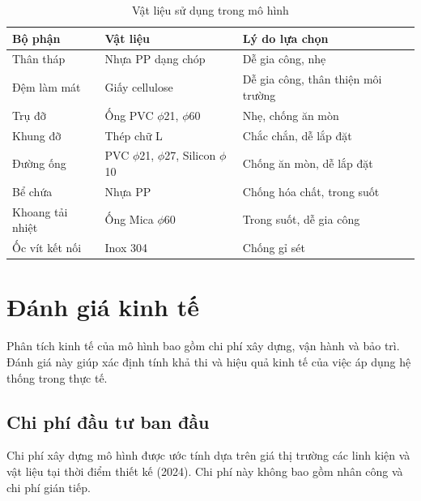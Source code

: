 \documentclass[../main.tex]{subfiles}
\begin{document}
\begin{table}[H]
\centering
\renewcommand{\arraystretch}{1.1}
\caption{Vật liệu sử dụng trong mô hình}
\label{tab:materials}
\begin{tabular}{|l|l|l|}
\hline
\textbf{Bộ phận} & \textbf{Vật liệu} & \textbf{Lý do lựa chọn} \\
\hline
Thân tháp & Nhựa PP dạng chóp & Dễ gia công, nhẹ \\
\hline
Đệm làm mát & Giấy cellulose & Dễ gia công, thân thiện môi trường \\
\hline
Trụ đỡ & Ống PVC $\phi$21, $\phi$60 & Nhẹ, chống ăn mòn \\
\hline
Khung đỡ & Thép chữ L & Chắc chắn, dễ lắp đặt \\
\hline
Đường ống & PVC $\phi$21, $\phi$27, Silicon $\phi$10 & Chống ăn mòn, dễ lắp đặt \\
\hline
Bể chứa & Nhựa PP & Chống hóa chất, trong suốt \\
\hline
Khoang tải nhiệt & Ống Mica $\phi$60 & Trong suốt, dễ gia công \\
\hline
Ốc vít kết nối & Inox 304 & Chống gỉ sét \\
\hline
\end{tabular}
\end{table}

\section{Đánh giá kinh tế}
\label{sec:economic_parameters}

Phân tích kinh tế của mô hình bao gồm chi phí xây dựng, vận hành và bảo trì. Đánh giá này giúp xác định tính khả thi và hiệu quả kinh tế của việc áp dụng hệ thống trong thực tế.

\subsection{Chi phí đầu tư ban đầu}
\label{sec:construction_cost}

Chi phí xây dựng mô hình được ước tính dựa trên giá thị trường các linh kiện và vật liệu tại thời điểm thiết kế (2024). Chi phí này không bao gồm nhân công và chi phí gián tiếp.
\end{document}
